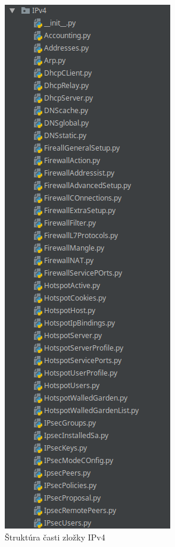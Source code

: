 \begin{figure}[H]
\centering
\includegraphics[scale=0.6]{../text/IP4.png}
\caption{Štruktúra časti zložky IPv4}
\label{fig:ipv4}
\end{figure}
\newpage
